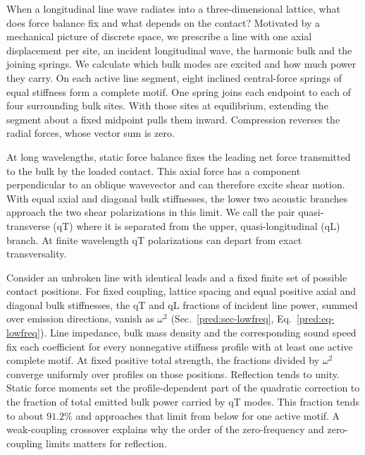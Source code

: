 \documentclass[10pt,aps,onecolumn,floatfix,notitlepage,nofootinbib,showkeys]{revtex4-2}
\begin{document}
When a longitudinal line wave radiates into a three-dimensional lattice, what does force balance fix and what depends on the contact? Motivated by a mechanical picture of discrete space, we prescribe a line with one axial displacement per site, an incident longitudinal wave, the harmonic bulk and the joining springs. We calculate which bulk modes are excited and how much power they carry. On each active line segment, eight inclined central-force springs of equal stiffness form a complete motif. One spring joins each endpoint to each of four surrounding bulk sites. With those sites at equilibrium, extending the segment about a fixed midpoint pulls them inward. Compression reverses the radial forces, whose vector sum is zero.

At long wavelengths, static force balance fixes the leading net force transmitted to the bulk by the loaded contact. This axial force has a component perpendicular to an oblique wavevector and can therefore excite shear motion. With equal axial and diagonal bulk stiffnesses, the lower two acoustic branches approach the two shear polarizations in this limit. We call the pair quasi-transverse (qT) where it is separated from the upper, quasi-longitudinal (qL) branch. At finite wavelength qT polarizations can depart from exact transversality.

Consider an unbroken line with identical leads and a fixed finite set of possible contact positions. For fixed coupling, lattice spacing and equal positive axial and diagonal bulk stiffnesses, the qT and qL fractions of incident line power, summed over emission directions, vanish as $\omega^2$ (Sec.~\ref{pred:sec-lowfreq}, Eq.~\eqref{pred:eq-lowfreq}). Line impedance, bulk mass density and the corresponding sound speed fix each coefficient for every nonnegative stiffness profile with at least one active complete motif. At fixed positive total strength, the fractions divided by $\omega^2$ converge uniformly over profiles on those positions. Reflection tends to unity. Static force moments set the profile-dependent part of the quadratic correction to the fraction of total emitted bulk power carried by qT modes. This fraction tends to about $91.2\%$ and approaches that limit from below for one active motif. A weak-coupling crossover explains why the order of the zero-frequency and zero-coupling limits matters for reflection.
\end{document}
